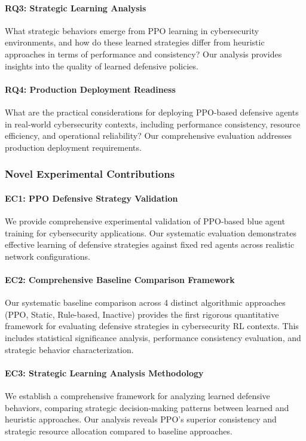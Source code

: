 \documentclass[12pt,oneside]{article}
\begin{document}
\paragraph{RQ3: Strategic Learning Analysis}
What strategic behaviors emerge from PPO learning in cybersecurity environments, and how do these learned strategies differ from heuristic approaches in terms of performance and consistency? Our analysis provides insights into the quality of learned defensive policies.

\paragraph{RQ4: Production Deployment Readiness}
What are the practical considerations for deploying PPO-based defensive agents in real-world cybersecurity contexts, including performance consistency, resource efficiency, and operational reliability? Our comprehensive evaluation addresses production deployment requirements.

\subsubsection{Novel Experimental Contributions}

\paragraph{EC1: PPO Defensive Strategy Validation}
We provide comprehensive experimental validation of PPO-based blue agent training for cybersecurity applications. Our systematic evaluation demonstrates effective learning of defensive strategies against fixed red agents across realistic network configurations.

\paragraph{EC2: Comprehensive Baseline Comparison Framework}
Our systematic baseline comparison across 4 distinct algorithmic approaches (PPO, Static, Rule-based, Inactive) provides the first rigorous quantitative framework for evaluating defensive strategies in cybersecurity RL contexts. This includes statistical significance analysis, performance consistency evaluation, and strategic behavior characterization.

\paragraph{EC3: Strategic Learning Analysis Methodology}
We establish a comprehensive framework for analyzing learned defensive behaviors, comparing strategic decision-making patterns between learned and heuristic approaches. Our analysis reveals PPO's superior consistency and strategic resource allocation compared to baseline approaches.
\end{document}
